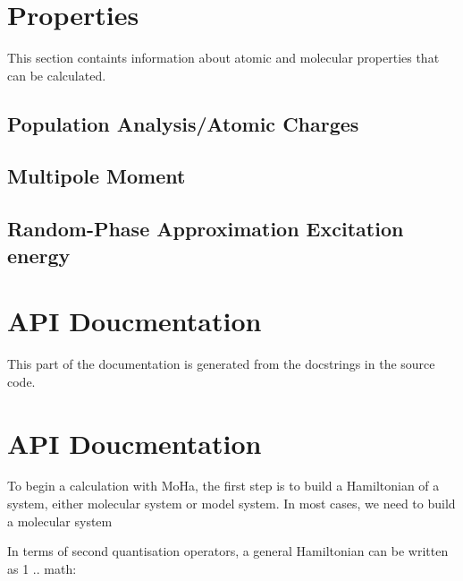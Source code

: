 \documentclass[letterpaper,10pt,english]{sphinxmanual}
\begin{document}
\section{Properties}
\label{\detokenize{properties:properties}}\label{\detokenize{properties:properties-rst}}\label{\detokenize{properties::doc}}
This section containts information about atomic and molecular properties that can be calculated.


\subsection{Population Analysis/Atomic Charges}
\label{\detokenize{properties:population-analysis-atomic-charges}}

\subsection{Multipole Moment}
\label{\detokenize{properties:multipole-moment}}

\subsection{Random-Phase Approximation Excitation energy}
\label{\detokenize{properties:random-phase-approximation-excitation-energy}}

\section{API Doucmentation}
\label{\detokenize{developer_api:api-doucmentation}}\label{\detokenize{developer_api::doc}}
This part of the documentation is generated from the docstrings in the source
code.


\section{API Doucmentation}
\label{\detokenize{developer_derivation:api-doucmentation}}\label{\detokenize{developer_derivation::doc}}
To begin a calculation with MoHa, the first step is to build a Hamiltonian of a
system, either molecular system or model system. In most cases, we need to build a molecular
system

In terms of second quantisation operators, a general Hamiltonian can be written
as
1
.. math:
\end{document}
